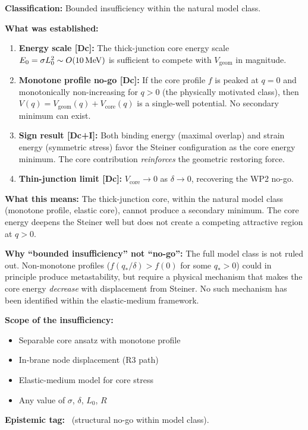 \begin{resultbox}[title=N7 WP2 Outcome: Bounded Insufficiency]
\textbf{Classification:} Bounded insufficiency within the natural
model class.

\textbf{What was established:}
\begin{enumerate}
    \item \textbf{Energy scale [Dc]:} The thick-junction core energy
          scale $E_0 = \sigma L_0^2 \sim O(10\,\mathrm{MeV})$ is sufficient to
          compete with $V_{\mathrm{geom}}$ in magnitude.
    \item \textbf{Monotone profile no-go [Dc]:} If the core profile $f$
          is peaked at $q = 0$ and monotonically non-increasing for
          $q > 0$ (the physically motivated class), then $V(q) =
          V_{\mathrm{geom}}(q) + V_{\mathrm{core}}(q)$ is a single-well
          potential. No secondary minimum can exist.
    \item \textbf{Sign result [Dc+I]:} Both binding energy (maximal
          overlap) and strain energy (symmetric stress) favor the Steiner
          configuration as the core energy minimum. The core contribution
          \emph{reinforces} the geometric restoring force.
    \item \textbf{Thin-junction limit [Dc]:} $V_{\mathrm{core}} \to 0$
          as $\delta \to 0$, recovering the WP2 no-go.
\end{enumerate}

\textbf{What this means:}
The thick-junction core, within the natural model class (monotone
profile, elastic core), cannot produce a secondary minimum. The core
energy deepens the Steiner well but does not create a competing
attractive region at $q > 0$.

\textbf{Why ``bounded insufficiency'' not ``no-go'':}
The full model class is not ruled out. Non-monotone profiles
($f(q_*/\delta) > f(0)$ for some $q_* > 0$) could in principle produce
metastability, but require a physical mechanism that makes the core
energy \emph{decrease} with displacement from Steiner. No such mechanism
has been identified within the elastic-medium framework.

\textbf{Scope of the insufficiency:}
\begin{itemize}
    \item Separable core ansatz with monotone profile
    \item In-brane node displacement (R3 path)
    \item Elastic-medium model for core stress
    \item Any value of $\sigma$, $\delta$, $L_0$, $R$
\end{itemize}

\textbf{Epistemic tag:} \tagDc\ (structural no-go within model class).
\end{resultbox}

